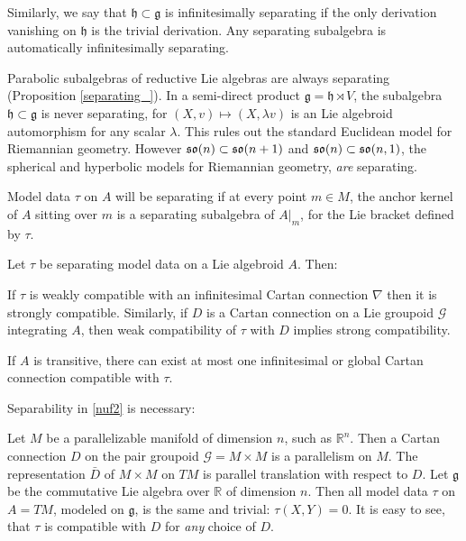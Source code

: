 \documentclass[leqno,12pt]{amsart} %
\begin{document}
Similarly, we say that ${\mathfrak h} \subset {\mathfrak g} $ is {\df infinitesimally
  separating} if the only derivation vanishing on ${\mathfrak h} $ is the trivial
derivation. Any separating subalgebra is automatically infinitesimally
separating.

Parabolic subalgebras of reductive Lie algebras are always separating (Proposition
\ref{separating_}). In a semi-direct product ${\mathfrak g} = {\mathfrak h} \rtimes V$,
the subalgebra ${\mathfrak h} \subset {\mathfrak g} $ is never separating, for
$(X, v) \mapsto (X, \lambda v)$ is an Lie algebroid automorphism for any scalar
$\lambda$. This rules out the standard Euclidean model for Riemannian geometry. However
$\mathfrak{so}(n) \subset \mathfrak{so}(n+1)$ and $\mathfrak{so}(n) \subset \mathfrak{so}(n, 1)$, the spherical and hyperbolic
models for Riemannian geometry, {\em are} separating.

Model data $\tau $ on $A$ will be {\df separating} if at every point $m \in M$, the anchor
kernel of $A$ sitting over $m$ is a separating subalgebra of $A|_m$, for the Lie bracket
defined by $\tau $.

\begin{theorem}
  Let $\tau $ be separating model data on a Lie algebroid $A$. Then:
  \begin{conditions}
  \item If $\tau$ is weakly compatible with an infinitesimal Cartan connection $\nabla$
    then it is strongly compatible. Similarly, if $D$ is a Cartan connection on a Lie
    groupoid ${\mathcal G} $ integrating $A$, then weak compatibility of $\tau$ with $D$
    implies strong compatibility. \label{nuf1}
  \item If $A$ is transitive, there can exist at most one infinitesimal or global Cartan
    connection compatible with $\tau $.\label{nuf2}
  \end{conditions}
\end{theorem}

Separability in \eqref{nuf2} is necessary:

\begin{example}
  Let $M $ be a parallelizable manifold of dimension $n$, such as ${\mathbb R}^n$. Then a
  Cartan connection $D$ on the pair groupoid ${\mathcal G} = M \times M$ is a parallelism
  on $M$. The representation $\bar D$ of $M \times M$ on $TM$ is parallel translation with
  respect to $D$.  Let ${\mathfrak g} $ be the commutative Lie algebra over ${\mathbb R} $
  of dimension $n$. Then all model data $\tau $ on $A= TM$, modeled on ${\mathfrak g} $,
  is the same and trivial: $\tau(X, Y)=0$. It is easy to see, that $\tau $ is compatible
  with $D$ for {\em any}  choice of $D$.
\end{example}
\end{document}
